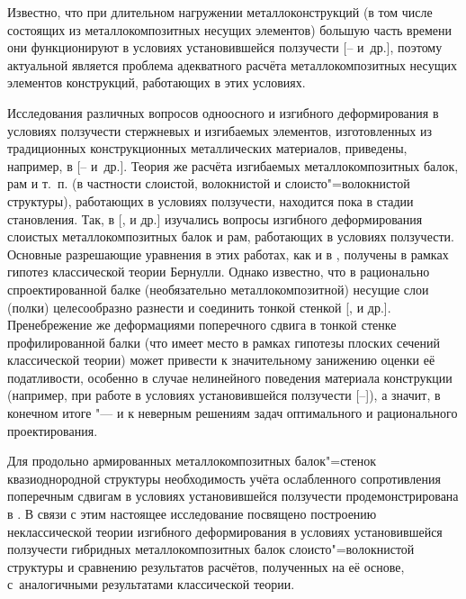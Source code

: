 Известно, что при длительном нагружении металлоконструкций (в том числе состоящих из металлокомпозитных несущих элементов) большую часть времени они функционируют в условиях установившейся ползучести [-- и~др.], поэтому актуальной является проблема адекватного расчёта металлокомпозитных несущих элементов конструкций, работающих в этих условиях.

Исследования различных вопросов одноосного и изгибного деформирования в условиях ползучести стержневых и изгибаемых элементов, изготовленных из традиционных конструкционных металлических материалов, приведены, например, в [-- и~др.]. Теория же расчёта изгибаемых металлокомпозитных балок, рам и т.~п. (в частности слоистой, волокнистой и слоисто"=волокнистой структуры), работающих в условиях ползучести, находится пока в стадии становления. Так, в [,  и др.] изучались вопросы изгибного деформирования слоистых металлокомпозитных балок и рам, работающих в условиях ползучести. Основные разрешающие уравнения в этих работах, как и в \cite{yan:bib4, yan:bib5}, получены в рамках гипотез классической теории Бернулли. Однако известно, что в рационально спроектированной балке (необязательно металлокомпозитной) несущие слои (полки) целесообразно разнести и соединить тонкой стенкой [,  и др.]. Пренебрежение же деформациями поперечного сдвига в тонкой стенке профилированной балки (что имеет место в рамках гипотезы плоских сечений классической теории) может привести к значительному занижению оценки её податливости, особенно в случае нелинейного поведения материала конструкции (например, при работе в условиях установившейся ползучести [--]), а значит, в конечном итоге "--- и к неверным решениям задач оптимального и рационального проектирования.

Для продольно армированных металлокомпозитных балок"=стенок квазиоднородной структуры необходимость учёта ослабленного сопротивления поперечным сдвигам в условиях установившейся ползучести продемонстрирована в \cite{yan:bib9}. В связи с этим настоящее исследование посвящено построению неклассической теории изгибного деформирования в условиях установившейся ползучести гибридных металлокомпозитных балок слоисто"=волокнистой структуры и сравнению результатов расчётов, полученных на её основе, с~аналогичными результатами классической теории.

\smallskip

\pagebreak

